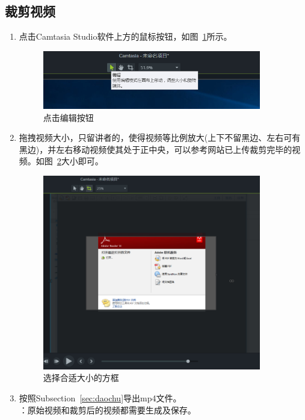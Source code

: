 \documentclass[12pt]{ctexart}
\begin{document}
\subsection{裁剪视频}
\begin{enumerate}
\item 点击Camtasia Studio软件上方的鼠标按钮，如图~\ref{fig:09.jpg}所示。\par
     \begin{figure}
    \centering
    \includegraphics[width=0.9\textwidth]{09.jpg}
    \caption{点击编辑按钮}
    \label{fig:09.jpg}
    \end{figure}
\item 拖拽视频大小，只留讲者的{\color{blue}{ppt部分}}，使得视频等比例放大(上下不留黑边、左右可有黑边)，并左右移动视频使其处于正中央，可以参考网站已上传裁剪完毕的视频。如图~\ref{fig:10.jpg}大小即可。\par
     \begin{figure}
    \centering
    \includegraphics[width=0.9\textwidth]{10.jpg}
    \caption{选择合适大小的方框}
    \label{fig:10.jpg}
    \end{figure}
\item 按照Subsection~\ref{sec:daochu}导出mp4文件。\\
{\color{blue}{注}}：原始视频和裁剪后的视频都需要生成及保存。
\end{enumerate} \newpage
\end{document}
